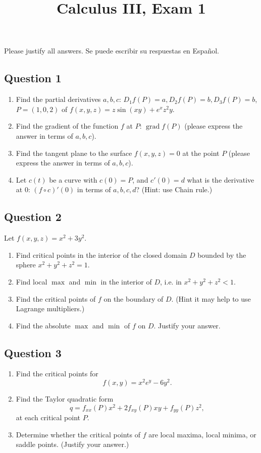\documentclass{amsart}
\numberwithin {equation} {section}
\DeclareMathOperator{\grad}{grad}
\begin{document}
 
\title {Calculus III, Exam 1}
\maketitle
Please justify all answers. Se puede escribir su
respuestas en Español.
\subsection* {Question 1}
\begin{enumerate}
   \item Find the partial derivatives $a,b,c$: $D_1 f (P) =a, D_2f
      (P)=b, D_3f (P)=b$, $P= (1,0,2)$ of $f(x,y,z)= z\sin (xy)+e
      ^{x}z ^{2}y  $.
   \item Find the gradient of the function $f$ at $P$: $\grad f (P)$ (please express the answer in terms of
      $a,b,c$).
   \item Find the tangent plane to the surface $f(x,y,z)=0$ at the point $P$
      (please express the answer in terms of
      $a,b,c$).
   \item Let $c (t)$ be a curve with $c (0)=P$, and $c' (0)=d$ what is the
      derivative at $0$: $(f \circ
      c)' (0)$ in terms of $a,b,c,d$? (Hint: use Chain rule.)
\end{enumerate}
\newpage
\subsection* {Question 2}
Let $f (x,y,z) = x ^{2} + 3y ^{2}$.
\begin{enumerate}
   \item   
Find critical points in the interior of the closed domain $D$ bounded by the sphere $x
^{2} +y ^{2} +z ^{2}=1   $.
\item Find local $\max$ and $\min$ in the interior of $D$, i.e. in
   $x
^{2} +y ^{2} +z ^{2}<1  $.
\item Find the critical points of $f$ on the boundary of $D$.
    (Hint it may help to use
   Lagrange multipliers.)
\item  Find the absolute $\max$ and $\min$ of $f$ on $D$. Justify your answer.
\end{enumerate} 
\newpage

\subsection* {Question 3}
\begin{enumerate}
\item Find the critical points for $$f (x,y)=x ^{2} e ^{y}   - 6y ^{2}.  $$
   \item Find the Taylor quadratic form $$q=f _{xx} (P)x ^{2} + 2f _{xy} (P) xy + f _{yy} (P) z
^{2},  $$  at each critical point $P$.
\item Determine whether the critical points of $f$ are local maxima, local
   minima, or saddle points. (Justify your answer.)
\end{enumerate}
\newpage
\end{document}
